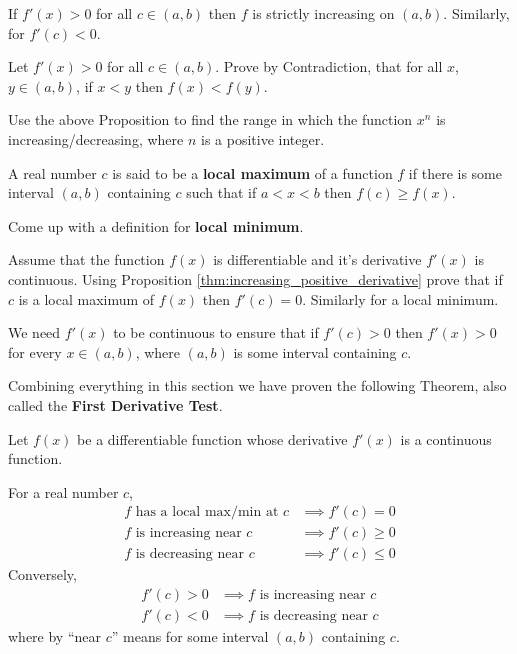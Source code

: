 \begin{prop}
	\label{thm:increasing_positive_derivative}
	If $f'(x) > 0$ for all $c \in (a,b)$ then $f$ is strictly increasing on $(a,b)$. Similarly, for $f'(c) < 0$.
\end{prop}

\begin{exercise}
	Let $f'(x) > 0$ for all $c \in (a,b)$. Prove by Contradiction, that for all $x$, $y \in (a,b)$, if $x < y$ then $f(x) < f(y)$.
\end{exercise}

\begin{exercise}
	Use the above Proposition to find the range in which the function $x^n$ is increasing/decreasing, where $n$ is a positive integer.
\end{exercise}

\begin{definition}A real number $c$ is said to be a {\bf local maximum} of a function $f$ if there is some interval $(a,b)$ containing $c$ such that if $a < x < b$ then $f(c) \ge f(x)$.
\end{definition}
\begin{exercise}
	Come up with a definition for {\bf local minimum}.
\end{exercise}
\begin{exercise} Assume that the function $f(x)$ is differentiable and it's derivative $f'(x)$ is continuous. Using Proposition \ref{thm:increasing_positive_derivative} prove that if $c$ is a local maximum of $f(x)$ then $f'(c) = 0$. Similarly for a local minimum.
\end{exercise}
\begin{remark}
	We need $f'(x)$ to be continuous to ensure that if $f'(c) > 0$ then $f'(x) > 0$ for every $ x \in (a,b)$, where $(a,b)$ is some interval containing $c$.
\end{remark}



Combining everything in this section we have proven the following Theorem, also called the {\bf First Derivative Test}.
\begin{theorem}
	Let $f(x)$ be a differentiable function whose derivative $f'(x)$ is a continuous function.

	For a real number $c$,
	\begin{align*}
		f	\mbox{ has a local max/min at } c & \implies f'(c) = 0   \\
		f \mbox{ is increasing near } c    & \implies f'(c) \ge 0 \\
		f \mbox{ is decreasing near } c    & \implies f'(c) \le 0
	\end{align*}
	Conversely,
	\begin{align*}
		f'(c) > 0 & \implies f \mbox{ is increasing near } c \\
		f'(c) < 0 & \implies f \mbox{ is decreasing near } c
	\end{align*}
	where by ``near $c$'' means for some interval $(a,b)$ containing $c$.
\end{theorem}

